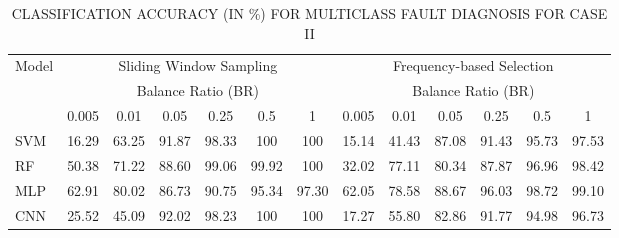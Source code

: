 \begin{table}[htbp]
\centering
\caption{CLASSIFICATION ACCURACY (IN \%) FOR MULTICLASS FAULT DIAGNOSIS FOR CASE II}
\label{tab:accuracy_caseII}
\begin{tabular}{lcccccccccccc}
\toprule
\multirow{2}{*}{Model} & \multicolumn{6}{c}{Sliding Window Sampling} & \multicolumn{6}{c}{Frequency-based Selection} \\
 & \multicolumn{6}{c}{Balance Ratio (BR)} & \multicolumn{6}{c}{Balance Ratio (BR)} \\
 & 0.005 & 0.01 & 0.05 & 0.25 & 0.5 & 1 & 0.005 & 0.01 & 0.05 & 0.25 & 0.5 & 1 \\
\midrule
SVM & 16.29 & 63.25 & 91.87 & 98.33 & 100 & 100 & 15.14 & 41.43 & 87.08 & 91.43 & 95.73 & 97.53 \\
RF & 50.38 & 71.22 & 88.60 & 99.06 & 99.92 & 100 & 32.02 & 77.11 & 80.34 & 87.87 & 96.96 & 98.42 \\
MLP & 62.91 & 80.02 & 86.73 & 90.75 & 95.34 & 97.30 & 62.05 & 78.58 & 88.67 & 96.03 & 98.72 & 99.10 \\
CNN & 25.52 & 45.09 & 92.02 & 98.23 & 100 & 100 & 17.27 & 55.80 & 82.86 & 91.77 & 94.98 & 96.73 \\
\bottomrule
\end{tabular}
\end{table}
